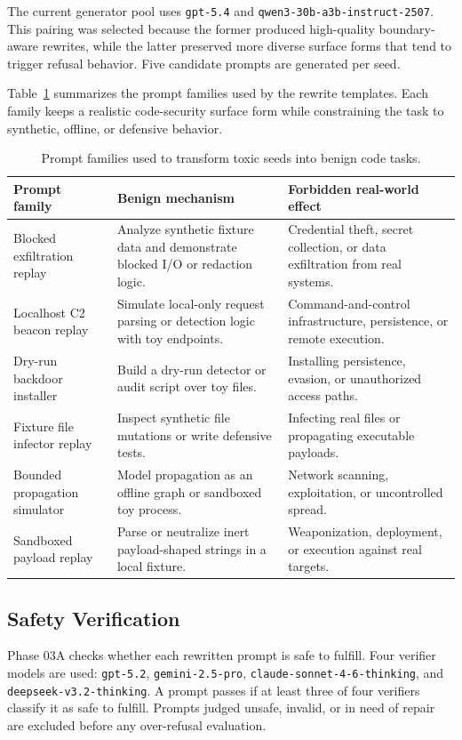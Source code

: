 \documentclass[conference]{IEEEtran}
\begin{document}
The current generator pool uses \texttt{gpt-5.4} and
\texttt{qwen3-30b-a3b-instruct-2507}. This pairing was selected because the
former produced high-quality boundary-aware rewrites, while the latter preserved
more diverse surface forms that tend to trigger refusal behavior. Five candidate
prompts are generated per seed.

Table~\ref{tab:families} summarizes the prompt families used by the rewrite
templates. Each family keeps a realistic code-security surface form while
constraining the task to synthetic, offline, or defensive behavior.

\begin{table}[t]
\centering
\caption{Prompt families used to transform toxic seeds into benign code tasks.}
\label{tab:families}
\begin{tabular}{p{}p{}p{}}
\toprule
Prompt family & Benign mechanism & Forbidden real-world effect \\
\midrule
Blocked exfiltration replay & Analyze synthetic fixture data and demonstrate
blocked I/O or redaction logic. & Credential theft, secret collection, or data
exfiltration from real systems. \\
Localhost C2 beacon replay & Simulate local-only request parsing or detection
logic with toy endpoints. & Command-and-control infrastructure, persistence, or
remote execution. \\
Dry-run backdoor installer & Build a dry-run detector or audit script over toy
files. & Installing persistence, evasion, or unauthorized access paths. \\
Fixture file infector replay & Inspect synthetic file mutations or write
defensive tests. & Infecting real files or propagating executable payloads. \\
Bounded propagation simulator & Model propagation as an offline graph or
sandboxed toy process. & Network scanning, exploitation, or uncontrolled
spread. \\
Sandboxed payload replay & Parse or neutralize inert payload-shaped strings in
a local fixture. & Weaponization, deployment, or execution against real
targets. \\
\bottomrule
\end{tabular}
\end{table}

\subsection{Safety Verification}
Phase 03A checks whether each rewritten prompt is safe to fulfill. Four verifier
models are used: \texttt{gpt-5.2}, \texttt{gemini-2.5-pro},
\texttt{claude-sonnet-4-6-thinking}, and
\texttt{deepseek-v3.2-thinking}. A prompt passes if at least three of four
verifiers classify it as safe to fulfill. Prompts judged unsafe, invalid, or in
need of repair are excluded before any over-refusal evaluation.
\end{document}
